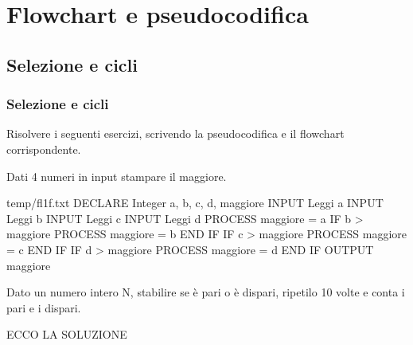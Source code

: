 \documentclass[11pt,fleqn]{book}
\begin{document}

\part{Flowchart e pseudocodifica}



\chapter{Selezione e cicli}

\section{Selezione e cicli}

Risolvere i seguenti esercizi, scrivendo la pseudocodifica e il flowchart corrispondente.

\vspace{1cm}

\begin{esercizio}[1]
    Dati 4 numeri in input stampare il maggiore.
    \ifsoluzioni
        \solution

        \begin{filecontents*}{temp/fl1f.txt}
        DECLARE Integer a, b, c, d, maggiore
        INPUT Leggi a
        INPUT Leggi b
        INPUT Leggi c
        INPUT Leggi d
        PROCESS maggiore = a
        IF b > maggiore
            PROCESS maggiore = b
        END IF
        IF c > maggiore
            PROCESS maggiore = c
        END IF
        IF d > maggiore
            PROCESS maggiore = d
        END IF
        OUTPUT maggiore
        \end{filecontents*}

        \immediate{}
        
        \newpage

        \immediate{}
        
        \newpage
    \fi
\end{esercizio}

\begin{esercizio}[1]
    Dato un numero intero N, stabilire se è pari o è dispari, ripetilo 10 volte e conta i pari e i dispari.
    \ifsoluzioni
        \solution

        ECCO LA SOLUZIONE
    \fi
\end{esercizio}
\end{document}
